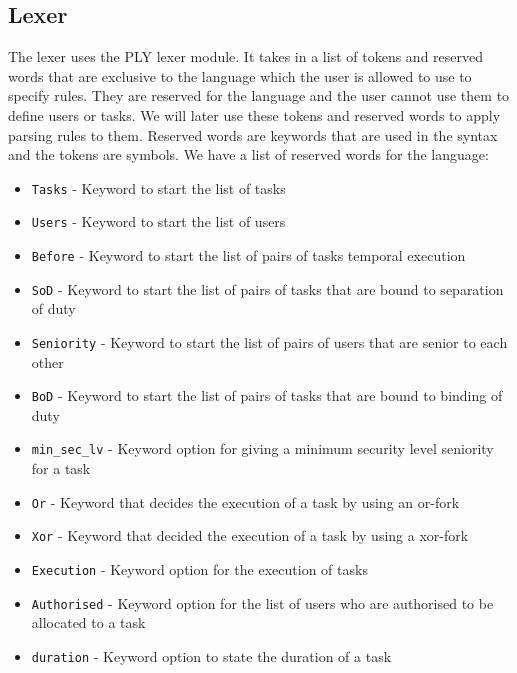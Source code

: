 \documentclass[a4paper]{report}
\begin{document}
\subsection{Lexer}
The lexer uses the PLY lexer module. It takes in a list of tokens and reserved words that are exclusive to the language which the user is allowed to use to specify rules. They are reserved for the language and the user cannot use them to define users or tasks. We will later use these tokens and reserved words to apply parsing rules to them. Reserved words are keywords that are used in the syntax and the tokens are symbols.
We have a list of reserved words for the language:
\begin{itemize}
\item \texttt{Tasks} - Keyword to start the list of tasks
\item \texttt{Users} - Keyword to start the list of users
\item \texttt{Before} - Keyword to start the list of pairs of tasks temporal execution
\item \texttt{SoD} - Keyword to start the list of pairs of tasks that are bound to separation of duty
\item \texttt{Seniority} - Keyword to start the list of pairs of users that are senior to each other
\item \texttt{BoD} - Keyword to start the list of pairs of tasks that are bound to binding of duty
\item \texttt{min\_sec\_lv} - Keyword option for giving a minimum security level seniority for a task
\item \texttt{Or} - Keyword that decides the execution of a task by using an or-fork
\item \texttt{Xor} - Keyword that decided the execution of a task by using a xor-fork
\item \texttt{Execution} - Keyword option for the execution of tasks
\item \texttt{Authorised} - Keyword option for the list of users who are authorised to be allocated to a task
\item \texttt{duration} - Keyword option to state the duration of a task
\end{itemize}
\end{document}
